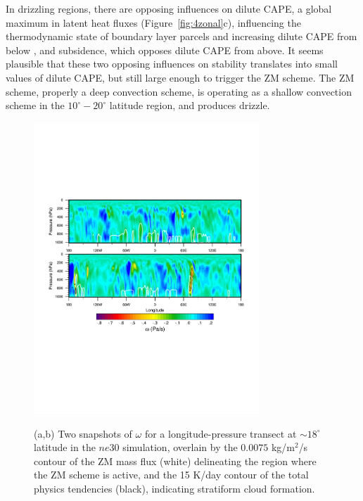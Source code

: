 \documentclass[times]{qjrms4}
\begin{document}
In drizzling regions, there are opposing influences on dilute CAPE, a global maximum in latent heat fluxes (Figure~\ref{fig:4zonal}c), influencing the thermodynamic state of boundary layer parcels and increasing dilute CAPE from below \citep{Z2002JGR}, and subsidence, which opposes dilute CAPE from above. It seems plausible that these two opposing influences on stability translates into small values of dilute CAPE, but still large enough to trigger the ZM scheme. The ZM scheme, properly a deep convection scheme, is operating as a shallow convection scheme in the $10^{\circ}-20^{\circ}$ latitude region, and produces drizzle.

\begin{figure}
\begin{center}
\noindent\includegraphics[width=20pc,angle=0]{figs/temp_trans.pdf}\\
\end{center}
\caption{(a,b) Two snapshots of $\omega$ for a longitude-pressure transect at $\sim 18^{\circ}$ latitude in the $ne30$ simulation, overlain by the $0.0075$ kg/m$^2$/s contour of the ZM mass flux (white) delineating the region where the ZM scheme is active, and the 15 K/day contour of the total physics tendencies (black), indicating stratiform cloud formation.}
\label{fig:transect}
\end{figure}
\end{document}
